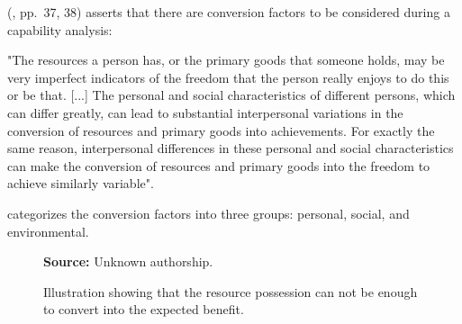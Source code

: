  (\citeyear{sen:1992}, pp.~37, 38) asserts that there are conversion factors to be considered during a capability analysis:
\begin{citacao}
    "The resources a person has, or the primary goods that someone holds, may be very imperfect indicators of the freedom that the person really enjoys to do this or be that. [...] The personal and social characteristics of different persons, which can differ greatly, can lead to substantial interpersonal variations in the conversion of resources and primary goods into achievements. For exactly the same reason, interpersonal differences in these personal and social characteristics can make the conversion of resources and primary goods into the freedom to achieve similarly variable".
\end{citacao}
 categorizes the conversion factors into three groups: personal, social, and environmental.

\begin{figure}[ht!]
\centering

\caption{\textmd{Illustration showing that the resource possession can not be enough to convert into the expected benefit.}}
\label{fig:resources-conversion-factors}

\par\medskip\ABNTEXfontereduzida\selectfont\textbf{Source:} Unknown authorship.%
\end{figure}

